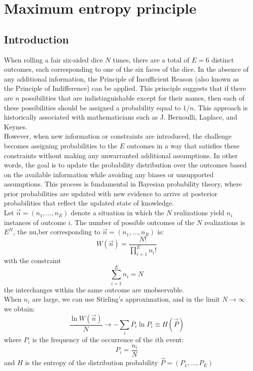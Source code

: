 \chapter{Maximum entropy principle}
\label{chap:maximum_entropy_principle}
\section{Introduction}
When rolling a fair six-sided dice $N$ times, there are a total of $E = 6$ distinct outcomes, each corresponding to one of the six faces of the dice. In the absence of any additional information, the Principle of Insufficient Reason (also known as the Principle of Indifference) can be applied. This principle suggests that if there are $n$ possibilities that are indistinguishable except for their names, then each of these possibilities should be assigned a probability equal to $1/n$. This approach is historically associated with mathematicians such as J. Bernoulli, Laplace, and Keynes.\\
However, when new information or constraints are introduced, the challenge becomes assigning probabilities to the $E$ outcomes in a way that satisfies these constraints without making any unwarranted additional assumptions. In other words, the goal is to update the probability distribution over the outcomes based on the available information while avoiding any biases or unsupported assumptions. This process is fundamental in Bayesian probability theory, where prior probabilities are updated with new evidence to arrive at posterior probabilities that reflect the updated state of knowledge.\\
Let $\vec{n} =(n_1,\ldots,n_E)$ denote a situation in which the $N$ realizations yield $n_i$ instances of outcome $i$. The number of possible outcomes of the $N$ realizations is $E^N$, the nu,ber corresponding to $\vec{n} = (n_1,\ldots,n_R)$ is:
\[
W(\vec{n})
 = \frac{N!}{\prod_{i=1}^{E} n_i!}
\]
with the constraint
\[
\sum_{i=1}^{E} n_i = N
\]
the interchanges within the same outcome are unobservable.\\
When $n_i$ are large, we can use Stirling's approximation, and in the limit $N \to \infty$ we obtain:
\[
\frac{\ln W (\vec{n})}{N} \to - \sum_i P_i \ln P_i \equiv H(\vec{P})
\]
where $P_i$ is the frequency of the occurrence of the $i$th event:
\[
P_i = \frac{n_i}{N}
\]
and $H$ is the entropy of the distribution probability $\vec{P} = (P_1,\ldots,P_E)$
